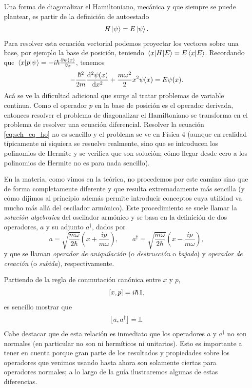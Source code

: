 \documentclass[10pt, a4paper]{article}
\newcommand{\aprefactsq}{\frac{m\omega}{2\hbar}}
\newcommand{\aprefact}{\sqrt{\aprefactsq}}
\numberwithin{equation}{subsection}
\begin{document}
Una forma de diagonalizar el Hamiltoniano, mecánica y que siempre se puede
plantear, es partir de la definición de autoestado
\begin{equation}
  H\ket{\psi} = E\ket{\psi}.
\end{equation}
Para resolver esta ecuación vectorial podemos proyectar los vectores sobre una
base, por ejemplo la base de posición, teniendo $\matrixel{x}{H}{E} =
E\braket{x}{E}$. Recordando que $\matrixel{x}{p}{\psi} =
-i\hbar\pdv{\psi(x)}{x}$, tenemos
\begin{equation} \label{eq:sch_eq_ho}
  -\frac{\hbar^2}{2m} \dv[2]{\psi(x)}{x} + \frac{m\omega^2}{2}x^2\psi(x) =
    E\psi(x).
\end{equation}
Acá se ve la dificultad adicional que surge al tratar problemas de variable
continua. Como el operador $p$ en la base de posición es el operador derivada,
entonces resolver el problema de diagonalizar el Hamiltoniano se transforma en
el problema de resolver una ecuación diferencial. Resolver la ecuación
\eqref{eq:sch_eq_ho} no es sencillo y el problema se ve en Física 4 (aunque en
realidad típicamente ni siquiera se resuelve realmente, sino que se introducen
los polinomios de Hermite y se verifica que son solución; cómo llegar desde
cero a los polinomios de Hermite no es para nada sencillo).

En la materia, como vimos en la teórica, no procedemos por este camino sino que
de forma completamente diferente y que resulta extremadamente más sencilla (y
cómo dijimos al principio además permite introducir conceptos cuya utilidad va
mucho más allá del oscilador armónico). Este procedimiento se suele llamar la
\emph{solución algebraica} del oscilador armónico y se basa en la definición de
dos operadores, $a$ y su adjunto $a^\dagger$, dados por
\begin{equation} \label{eq:def_a_adagger}
  a = \aprefact\left(x + \frac{ip}{m\omega}\right), \qquad
  a^\dagger = \aprefact\left(x - \frac{ip}{m\omega}\right),
\end{equation}
y que se llaman \emph{operador de aniquilación} (o \emph{destrucción} o
\emph{bajada}) y \emph{operador de creación} (o \emph{subida}),
respectivamente.

Partiendo de la regla de conmutación canónica entre $x$ y $p$,
\begin{equation} \label{eq:xp_comm}
  \comm{x}{p} = i\hbar\,\Id,
\end{equation}
es sencillo mostrar que
\begin{equation} \label{eq:aadgger_comm}
  \comm{a}{a^\dagger} = \Id.
\end{equation}
Cabe destacar que de esta relación es inmediato que los operadores $a$ y
$a^\dagger$ no son normales (en particular no son ni hermíticos ni unitarios).
Esto es importante a tener en cuenta porque gran parte de los resultados y
propiedades sobre los operadores que venimos usando hasta ahora son solamente
ciertas para operadores normales; a lo largo de la guía ilustraremos algunas de
estas diferencias.
\end{document}
